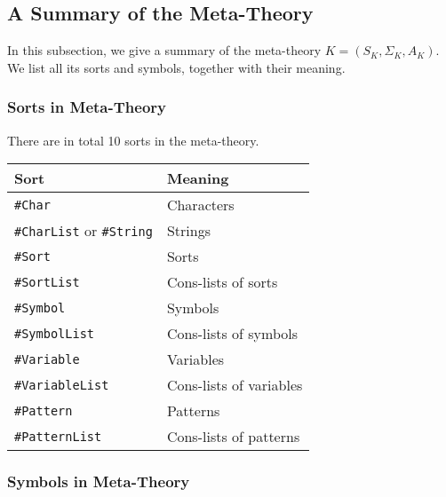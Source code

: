 \documentclass[UTF8,11pt]{article}
\theoremstyle{plain}
\theoremstyle{definition}
\theoremstyle{remark}
\newcommand{\sharpsymbol}{\#}
\newcommand{\KChar}{\texttt{\sharpsymbol Char}}
\newcommand{\KCharList}{\texttt{\sharpsymbol CharList}}
\newcommand{\KString}{\texttt{\sharpsymbol String}}
\newcommand{\KSort}{\texttt{\sharpsymbol Sort}}
\newcommand{\KSymbol}{\texttt{\sharpsymbol Symbol}}
\newcommand{\KPatternList}{\texttt{\sharpsymbol PatternList}}
\newcommand{\KSortList}{\texttt{\sharpsymbol SortList}}
\newcommand{\KSymbolList}{\texttt{\sharpsymbol SymbolList}}
\newcommand{\KVariableList}{\texttt{\sharpsymbol VariableList}\xspace}
\newcommand{\KVariable}{\texttt{\sharpsymbol Variable}}
\newcommand{\KPattern}{\texttt{\sharpsymbol Pattern}}
\begin{document}
\subsection{A Summary of the Meta-Theory}
\label{sec:K-summary}
In this subsection, we give a summary of the meta-theory $K = (S_K, \Sigma_K, 
A_K)$.
We list all its sorts and symbols, together with their meaning.

\subsubsection{Sorts in Meta-Theory}
There are in total 10 sorts in the meta-theory.
\begin{center}
	\begin{tabular}{l|l}
		\textbf{Sort} & \textbf{Meaning} \\
		\hline
		\KChar & Characters \\
		{\KCharList} or \KString & Strings \\
		\KSort & Sorts \\
		\KSortList & Cons-lists of sorts \\
		\KSymbol & Symbols \\
		\KSymbolList & Cons-lists of symbols \\
		\KVariable & Variables \\
		\KVariableList & Cons-lists of variables \\
		\KPattern & Patterns \\
		\KPatternList & Cons-lists of patterns \\
	\end{tabular}
\end{center}

\subsubsection{Symbols in Meta-Theory}
\end{document}
